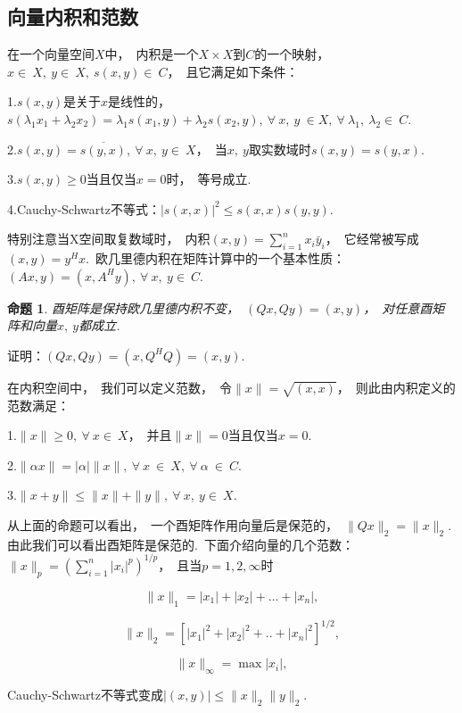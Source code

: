 \documentclass{article}
\begin{document}
\subsection{向量内积和范数}
在一个向量空间$X$中，~内积是一个$X\times X$到$C$的一个映射，~$x\in ~X,~y\in ~X,~ s(x,y)\in~ C$，~且它满足如下条件：

1.$s(x,y)$是关于$x$是线性的，~$s(\lambda _1 x_1+\lambda _2 x_2)=\lambda _1 s(x_1,y)+\lambda _2 s(x_2,y),~\forall~ x,~y~\in X,~\forall ~\lambda _1 ,~\lambda _2 \in~ C$.

2.$s(x,y)=\overline{s(y,x)},\ \forall ~x,\ y\in~ X$，~当$x,~y$取实数域时$s(x,y)=s(y,x)$.

3.$s(x,y)\ge 0$当且仅当$x=0$时，~等号成立.

4.Cauchy-Schwartz不等式：$\vert s(x,x)\vert^2\leqslant s(x,x)s(y,y)$.

特别注意当X空间取复数域时，~内积$(x,y)=\sum_{i=1}^n x_i\bar{y}_i$，~它经常被写成$(x,y)=y^Hx$.~欧几里德内积在矩阵计算中的一个基本性质：$(Ax,y)=(x,A^Hy),\ \forall ~x,\ y\in~ C$.

\newtheorem{proposition}{命题}
\begin{proposition}
酉矩阵是保持欧几里德内积不变，~$(Qx,Qy)=(x,y)$，~对任意酉矩阵和向量$x,~y$都成立.
\end{proposition}

证明：$(Qx,Qy)=(x,Q^HQ)=(x,y)$.

在内积空间中，~我们可以定义范数，~令$\parallel x\parallel=\sqrt{(x,x)}$，~则此由内积定义的范数满足：

1.$\parallel x\parallel \ge 0,\ \forall ~x\in~X$，\ 并且$\parallel x\parallel=0$当且仅当$x=0$.

2.$\parallel \alpha x\parallel =|\alpha| \parallel x\parallel,\ \forall ~x\ \in ~ X,\ \forall ~\alpha \ \in~ C$.

3.$\parallel x+y \parallel \leqslant \parallel x\parallel + \parallel y\parallel ,~\forall ~x,~y\in~ X$.

从上面的命题可以看出，~一个酉矩阵作用向量后是保范的，~$\parallel Qx \parallel_2=\parallel x \parallel_2.$由此我们可以看出酉矩阵是保范的.\ 下面介绍向量的几个范数：
$\parallel x \parallel_p=(\sum_{i=1}^n |x_i|^p)^{1/p}$，\ 且当$p=1,2,\infty$时

$$\parallel x \parallel_1=|x_1|+|x_2|+...+|x_n|,$$

$$\parallel x \parallel_2=[|x_1|^2+|x_2|^2+..+|x_n|^2]^{1/2},$$

$$\parallel x \parallel_\infty=\max |x_i|,$$

Cauchy-Schwartz不等式变成$|(x,y)|\leqslant \parallel x \parallel_2\parallel y\parallel_2$.
\end{document}
